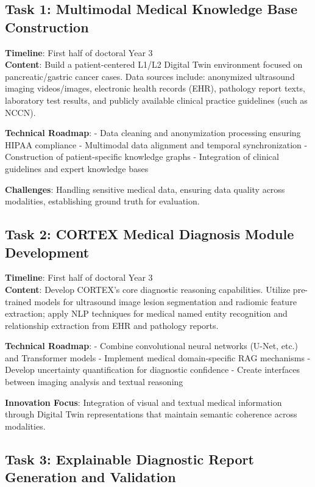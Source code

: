 \subsection{Task 1: Multimodal Medical Knowledge Base Construction}

\textbf{Timeline}: First half of doctoral Year 3\\
\textbf{Content}: Build a patient-centered L1/L2 Digital Twin environment focused on pancreatic/gastric cancer cases. Data sources include: anonymized ultrasound imaging videos/images, electronic health records (EHR), pathology report texts, laboratory test results, and publicly available clinical practice guidelines (such as NCCN).

\textbf{Technical Roadmap}: 
- Data cleaning and anonymization processing ensuring HIPAA compliance
- Multimodal data alignment and temporal synchronization
- Construction of patient-specific knowledge graphs
- Integration of clinical guidelines and expert knowledge bases

\textbf{Challenges}: Handling sensitive medical data, ensuring data quality across modalities, establishing ground truth for evaluation.

\subsection{Task 2: CORTEX Medical Diagnosis Module Development}

\textbf{Timeline}: First half of doctoral Year 3\\
\textbf{Content}: Develop CORTEX's core diagnostic reasoning capabilities. Utilize pre-trained models for ultrasound image lesion segmentation and radiomic feature extraction; apply NLP techniques for medical named entity recognition and relationship extraction from EHR and pathology reports.

\textbf{Technical Roadmap}: 
- Combine convolutional neural networks (U-Net, etc.) and Transformer models
- Implement medical domain-specific RAG mechanisms
- Develop uncertainty quantification for diagnostic confidence
- Create interfaces between imaging analysis and textual reasoning

\textbf{Innovation Focus}: Integration of visual and textual medical information through Digital Twin representations that maintain semantic coherence across modalities.

\subsection{Task 3: Explainable Diagnostic Report Generation and Validation}

